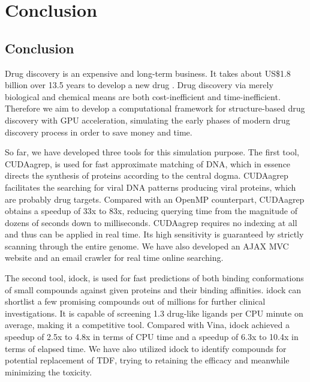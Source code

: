 \chapter{Conclusion}

\section{Conclusion}

Drug discovery is an expensive and long-term business. It takes about US\$1.8 billion over 13.5 years to develop a new drug \citep{716-2010}. Drug discovery via merely biological and chemical means are both cost-inefficient and time-inefficient. Therefore we aim to develop a computational framework for structure-based drug discovery with GPU acceleration, simulating the early phases of modern drug discovery process in order to save money and time.

So far, we have developed three tools for this simulation purpose. The first tool, CUDAagrep, is used for fast approximate matching of DNA, which in essence directs the synthesis of proteins according to the central dogma. CUDAagrep facilitates the searching for viral DNA patterns producing viral proteins, which are probably drug targets. Compared with an OpenMP counterpart, CUDAagrep obtains a speedup of 33x to 83x, reducing querying time from the magnitude of dozens of seconds down to milliseconds. CUDAagrep requires no indexing at all and thus can be applied in real time. Its high sensitivity is guaranteed by strictly scanning through the entire genome. We have also developed an AJAX MVC website and an email crawler for real time online searching.

The second tool, idock, is used for fast predictions of both binding conformations of small compounds against given proteins and their binding affinities. idock can shortlist a few promising compounds out of millions for further clinical investigations. It is capable of screening 1.3 drug-like ligands per CPU minute on average, making it a competitive tool. Compared with Vina, idock achieved a speedup of 2.5x to 4.8x in terms of CPU time and a speedup of 6.3x to 10.4x in terms of elapsed time. We have also utilized idock to identify compounds for potential replacement of TDF, trying to retaining the efficacy and meanwhile minimizing the toxicity.


